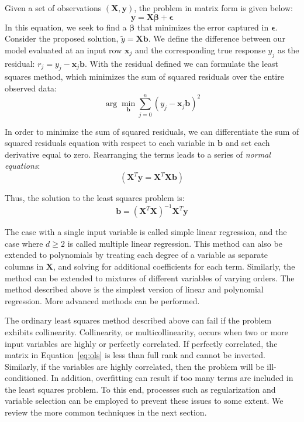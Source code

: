 Given a set of observations $(\mathbf{X},\mathbf{y})$, the problem in matrix form is given below:
%
\begin{equation}
\mathbf{y} = \mathbf{X}\boldsymbol\beta + \boldsymbol\epsilon
\end{equation}
%
In this equation, we seek to find a $\boldsymbol\beta$ that minimizes the error captured in $\boldsymbol\epsilon$.
%
Consider the proposed solution, $\tilde{y} = \mathbf{X}\mathbf{b}$.
%
We define the difference between our model evaluated at an input row $\mathbf{x}_j$ and the corresponding true response $y_j$ as the residual: $r_j = y_j - \mathbf{x}_j\mathbf{b}$.
%
With the residual defined we can formulate the least squares method, which minimizes the sum of squared residuals over the entire observed data:
\begin{equation}
\arg\min_{\mathbf{b}} \sum_{j=0}^n(y_j - \mathbf{x}_j\mathbf{b})^2
\end{equation}

In order to minimize the sum of squared residuals, we can differentiate the sum of squared residuals equation with respect to each variable in $\mathbf{b}$ and set each derivative equal to zero.
%
Rearranging the terms leads to a series of \emph{normal equations}:
\begin{equation}
(\mathbf{X}^T\mathbf{y}= \mathbf{X}^T\mathbf{X}\mathbf{b})
\end{equation}

Thus, the solution to the least squares problem is:
\begin{equation}
\mathbf{b} = (\mathbf{X}^T \mathbf{X})^{-1} \mathbf{X}^T \mathbf{y}
\label{eq:ols}
\end{equation}

The case with a single input variable is called simple linear regression, and the case where $d\geq 2$ is called multiple linear regression.
%
This method can also be extended to polynomials by treating each degree of a variable as separate columns in $\mathbf{X}$, and solving for additional coefficients for each term.
%
Similarly, the method can be extended to mixtures of different variables of varying orders.
%
The method described above is the simplest version of linear and polynomial regression.
%
More advanced methods can be performed.

The ordinary least squares method described above can fail if the problem exhibits collinearity.
%
Collinearity, or multicollinearity, occurs when two or more input variables are highly or perfectly correlated.
%
If perfectly correlated, the matrix in Equation~\ref{eq:ols} is less than full rank and cannot be inverted.
%
Similarly, if the variables are highly correlated, then the problem will be ill-conditioned.
%
In addition, overfitting can result if too many terms are included in the least squares problem.
%
To this end, processes such as regularization and variable selection can be employed to prevent these issues to some extent.
%
We review the more common techniques in the next section.


